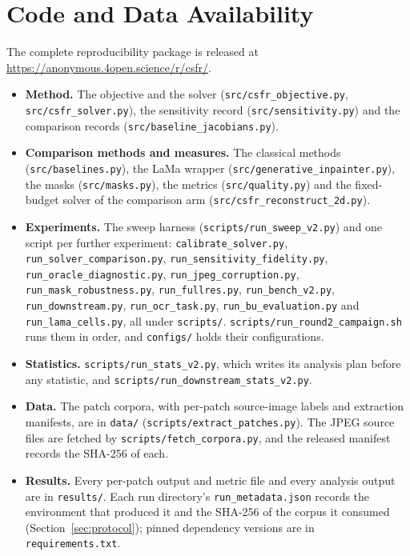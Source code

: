 \documentclass[final,3p]{elsarticle}
\newcommand{\repourl}{https://anonymous.4open.science/r/csfr/}
\begin{document}
\section*{Code and Data Availability}
The complete reproducibility package is released at \url{\repourl}.
\begin{itemize}
  \item \textbf{Method.} The objective and the solver (\texttt{src/\allowbreak csfr\allowbreak\_objective.py}, \texttt{src/\allowbreak csfr\allowbreak\_solver.py}), the sensitivity record (\texttt{src/\allowbreak sensitivity.py}) and the comparison records (\texttt{src/\allowbreak baseline\allowbreak\_jacobians.py}).
  \item \textbf{Comparison methods and measures.} The classical methods (\texttt{src/\allowbreak baselines.py}), the LaMa wrapper (\texttt{src/\allowbreak generative\allowbreak\_inpainter.py}), the masks (\texttt{src/\allowbreak masks.py}), the metrics (\texttt{src/\allowbreak quality.py}) and the fixed-budget solver of the comparison arm (\texttt{src/\allowbreak csfr\allowbreak\_reconstruct\allowbreak\_2d.py}).
  \item \textbf{Experiments.} The sweep harness (\texttt{scripts/\allowbreak run\allowbreak\_sweep\allowbreak\_v2.py}) and one script per further experiment: \texttt{calibrate\allowbreak\_solver.py}, \texttt{run\allowbreak\_solver\allowbreak\_comparison.py}, \texttt{run\allowbreak\_sensitivity\allowbreak\_fidelity.py}, \texttt{run\allowbreak\_oracle\allowbreak\_diagnostic.py}, \texttt{run\allowbreak\_jpeg\allowbreak\_corruption.py}, \texttt{run\allowbreak\_mask\allowbreak\_robustness.py}, \texttt{run\allowbreak\_fullres.py}, \texttt{run\allowbreak\_bench\allowbreak\_v2.py}, \texttt{run\allowbreak\_downstream.py}, \texttt{run\allowbreak\_ocr\allowbreak\_task.py}, \texttt{run\allowbreak\_bu\allowbreak\_evaluation.py} and \texttt{run\allowbreak\_lama\allowbreak\_cells.py}, all under \texttt{scripts/}. \texttt{scripts/\allowbreak run\allowbreak\_round2\allowbreak\_campaign.sh} runs them in order, and \texttt{configs/} holds their configurations.
  \item \textbf{Statistics.} \texttt{scripts/\allowbreak run\allowbreak\_stats\allowbreak\_v2.py}, which writes its analysis plan before any statistic, and \texttt{scripts/\allowbreak run\allowbreak\_downstream\allowbreak\_stats\allowbreak\_v2.py}.
  \item \textbf{Data.} The patch corpora, with per-patch source-image labels and extraction manifests, are in \texttt{data/} (\texttt{scripts/\allowbreak extract\allowbreak\_patches.py}). The JPEG source files are fetched by \texttt{scripts/\allowbreak fetch\allowbreak\_corpora.py}, and the released manifest records the SHA-256 of each.
  \item \textbf{Results.} Every per-patch output and metric file and every analysis output are in \texttt{results/}. Each run directory's \texttt{run\allowbreak\_metadata.json} records the environment that produced it and the SHA-256 of the corpus it consumed (Section~\ref{sec:protocol}); pinned dependency versions are in \texttt{requirements.txt}.
\end{itemize}
\end{document}
